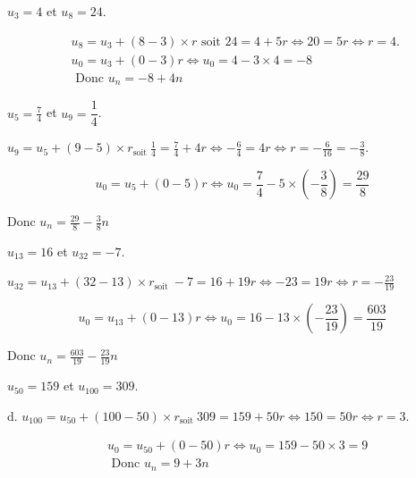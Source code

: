 \documentclass[11pt,a4paper]{article}  %
\begin{document}
	\begin{enumMet}
	\item $u_3=4$ et $u_8=24$.
	\begin{corrBox}
		$$
		\begin{aligned}
			& u_8=u_3+(8-3) \times r \text { soit } 24=4+5 r \Longleftrightarrow 20=5 r \Longleftrightarrow r=4 \text {. } \\
			& u_0=u_3+(0-3) r \Longleftrightarrow u_0=4-3 \times 4=-8 \\
			& \text { Donc } u_n=-8+4 n
		\end{aligned}
		$$
	\end{corrBox}
	\item $u_5=\frac{7}{4}$ et $u_9=\dfrac{1}{4}$.
	\begin{corrBox}
		
		$u_9=u_5+(9-5) \times r_{\text {soit }} \frac{1}{4}=\frac{7}{4}+4 r \Longleftrightarrow-\frac{6}{4}=4 r \Longleftrightarrow r=-\frac{6}{16}=-\frac{3}{8}$.
		
		$$
		u_0=u_5+(0-5) r \Longleftrightarrow u_0=\frac{7}{4}-5 \times\left(-\frac{3}{8}\right)=\frac{29}{8}
		$$
		
		
		Donc $u_n=\frac{29}{8}-\frac{3}{8} n$				
	\end{corrBox}
	\item $u_{13}=16$ et $u_{32}=-7$.
	\begin{corrBox}
		$u_{32}=u_{13}+(32-13) \times r_{\text {soit }}-7=16+19 r \Longleftrightarrow-23=19 r \Longleftrightarrow r=-\frac{23}{19}$
		
		$$
		u_0=u_{13}+(0-13) r \Longleftrightarrow u_0=16-13 \times\left(-\frac{23}{19}\right)=\frac{603}{19}
		$$
		
		
		Donc $u_n=\frac{603}{19}-\frac{23}{19} n$	
	\end{corrBox}
	\item $u_{50}=159$ et $u_{100}=309$.
	\begin{corrBox}
		d. $u_{100}=u_{50}+(100-50) \times r_{\text {soit }} 309=159+50 r \Longleftrightarrow 150=50 r \Longleftrightarrow r=3$.	
		
		$$
		\begin{aligned}
			& u_0=u_{50}+(0-50) r \Longleftrightarrow u_0=159-50 \times 3=9 \\
			& \text { Donc } u_n=9+3 n
		\end{aligned}
		$$		
	\end{corrBox}
\end{enumMet}
\end{document}
